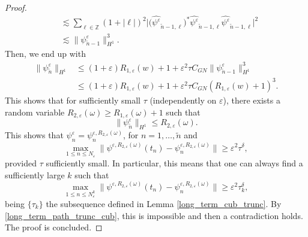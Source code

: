 \documentclass[10pt,a4paper]{amsart}
\begin{document}
\begin{proof}
\begin{align*}
&\lesssim \displaystyle\sum_{\ell\in\mathbb{Z}}\left(1+\left|\ell\right|\right)^{2} \big| \big( \widehat{\psi^\varepsilon}_{\tilde{n}-1,\ell} \big)^*\widehat{\psi^\varepsilon}_{\tilde{n}-1,\ell}\widehat{\psi^\varepsilon}_{\tilde{n}-1,\ell}\big|^2\\
&\lesssim \|\psi^\varepsilon_{\tilde{n}-1}\|^3_{H^1}.
\end{align*}
Then, we end up with
\begin{align*}
    \|\psi^\varepsilon_{\tilde{n}}\|_{H^1}&\le (1+\varepsilon)R_{1,\varepsilon}(w)+1+\varepsilon^2\tau C_{GN}  \|\psi^\varepsilon_{\tilde{n}-1}\|^3_{H^1}\\
    &\le  (1+\varepsilon)R_{1,\varepsilon}(w)+1+\varepsilon^2\tau C_{GN} (R_{1,\varepsilon}(w)+1)^3.
\end{align*}
This shows that for sufficiently small $\tau$ (independently on $\varepsilon$), there exists a random variable $R_{2,\varepsilon}(\omega)\ge R_{1,\varepsilon}(\omega)+1$ such that
$$
\|\psi^\varepsilon_{\tilde{n}}\|_{H^1}\le R_{2,\varepsilon}(\omega).
$$
This shows that $\psi^\varepsilon_n=\psi_n^{\varepsilon,R_{2,\varepsilon}(\omega)}$, for $n=1,\dots,\tilde{n}$ and 
$$
\max_{1\le n \le N_\varepsilon} \|\psi^{\varepsilon, R_{2,\varepsilon}(\omega)}(t_n)-\psi^{\varepsilon, R_{2,\varepsilon}(\omega)}_n\|\ge \varepsilon^2 \tau^\delta,
$$
provided $\tau$ sufficiently small. In particular, this means that one can always find a sufficiently large $k$ such that 
$$
\max_{1\le n \le N^k_\varepsilon} \|\psi^{\varepsilon, R_{2,\varepsilon}(\omega)}(t_n)-\psi^{\varepsilon, R_{2,\varepsilon}(\omega)}_n\|\ge \varepsilon^2 \tau_k^\delta,
$$
being $\{\tau_k\}$ the subsequence defined in Lemma \ref{long_term_cub_trunc}. By \eqref{long_term_path_trunc_cub}, this is impossible and then a contradiction holds. The proof is concluded.
\end{proof}
\end{document}
